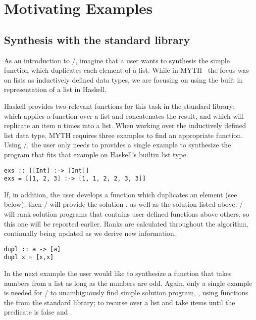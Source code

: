 \section{Motivating Examples} 
\label{examples}

\subsection{Synthesis with the standard library}

As an introduction to \ourTool/, imagine that a user wants to synthesis the simple  \cite{Osera:2015} function which duplicates each element of a list. While in MYTH~\cite{Osera:2015} the focus was on lists as inductively defined data types, we are focusing on using the built in representation of a list in Haskell.

Haskell provides two relevant functions for this task in the standard library;  which applies a function over a list and concatenates the result, and  which will replicate an item n times into a list. When working over the inductively defined list data type, MYTH requires three examples to find an appropriate function. Using \ourTool/, the user only needs to provides a single example to synthesize the program  that fits that example on Haskell's builtin list type.

\begin{lstlisting}
exs :: [[Int] :-> [Int]]
exs = [[1, 2, 3] :-> [1, 1, 2, 2, 3, 3]]
\end{lstlisting}

If, in addition, the user develops a function  which duplicates an element (see below), then \ourTool/ will provide the solution , as well as the solution listed above. \ourTool/ will rank solution programs that contains user defined functions above others, so this one will be reported earlier. Ranks are calculated throughout the algorithm, continually being updated as we derive new information.

\begin{lstlisting}
dupl :: a -> [a]
dupl x = [x,x]
\end{lstlisting}

In the next example the user would like to synthesize a function that takes numbers from a list as long as the numbers are odd.
Again, only a single example is needed for \ourTool/ to unambiguously find  simple solution program, , using functions the from the standard library;  to recurse over a list and take items until the predicate is false and . 

